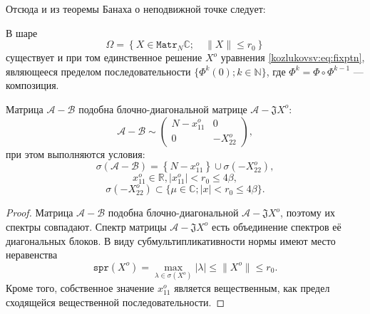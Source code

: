 Отсюда и из теоремы Банаха о неподвижной точке следует:
\begin{lem}
В шаре \[ \Omega = \left\{ X\in\mathtt{Matr}_N\mathbb{C}; \quad \|X\| \leq r_0 \right\} \]
    существует и при том единственное решение \( X^o \) уравнения \eqref{kozlukovsv:eq:fixptn},
    являющееся пределом последовательности \( \{ \Phi^k(0); k\in\mathbb{N} \} \),
    где \( \Phi^k = \Phi\circ\Phi^{k-1} \) --- композиция.
\end{lem}

\begin{crl}
Матрица \( \mathcal{A} - \mathcal{B} \) подобна блочно-диагональной матрице \( \mathcal{A} - \mathfrak{J} X^o \):
\[ \mathcal{A} - \mathcal{B} \sim
\begin{pmatrix}
N - x_{11}^o & 0 \\
0 & -X_{22}^o
\end{pmatrix}, \]
при этом выполняются условия:
\[ \sigma\left(\mathcal{A} - \mathcal{B}\right) = \left\{N-x_{11}^o\right\}\cup \sigma\left(-X_{22}^o\right), \]
    \[ x_{11}^o\in\mathbb{R}, \lvert x_{11}^o \rvert < r_0 \leq 4\beta, \]
\[ \sigma\left(-X_{22}^o\right) \subset \{ \mu\in\mathbb{C}; \lvert x \rvert < r_0 \leq 4\beta \}. \]
\end{crl}
\begin{proof}
    Матрица \( \mathcal{A} - \mathcal{B} \) подобна блочно-диагональной \( \mathcal{A} - \mathfrak{J} X^o \),
    поэтому их спектры совпадают.
    Спектр матрицы \( \mathcal{A} - \mathfrak{J} X^o \) есть объединение спектров е\"е диагональных блоков.
    В виду субмультипликативности нормы имеют место неравенства
    \[ \mathtt{spr}(X^o) = \max_{\lambda\in\sigma(X^o)}\lvert\lambda\rvert \leq \|X^o\| \leq r_0. \]
    Кроме того, собственное значение \( x_{11}^o \) является вещественным, как предел сходящейся вещественной последовательности.
\end{proof}
